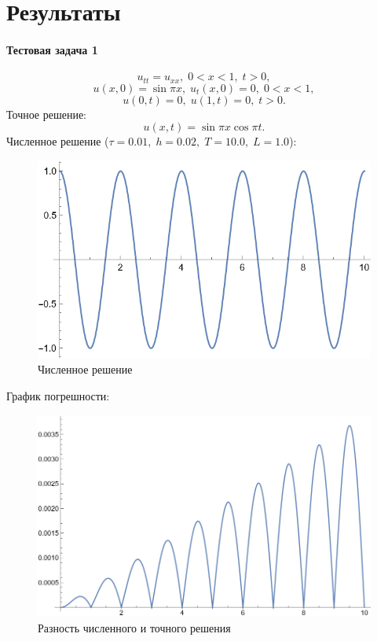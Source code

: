 \documentclass[12pt, a4paper]{article}
\begin{document}
\begin{enumerate}

	\end{enumerate}
	\newpage
	\section{Результаты}
	\paragraph{Тестовая задача 1}
	\[
	u_{tt}=u_{xx},\;0<x<1,\;t>0,
	\]
	\[
	u(x,0)=\sin{\pi x},\; u_t(x,0)=0,\;0<x<1,
	\]
	\[
	u(0,t)=0,\;u(1,t)=0,\;t>0.
	\]
	Точное решение:
	\[
u(x,t)=\sin{\pi x} \cos{\pi t}.
	\]
	Численное решение ($\tau = 0.01,\;h=0.02,\;T=10.0,\;L=1.0$):	
		\begin{figure}[H]
		\centering
		\includegraphics[width=0.7\linewidth]{test1numerical}
		\caption{Численное решение}
	\end{figure}
	График погрешности:
		\begin{figure}[H]
		\centering
		\includegraphics[width=0.7\linewidth]{test1pogr}
		\caption{Разность численного и точного решения}
	\end{figure}
\end{document}
